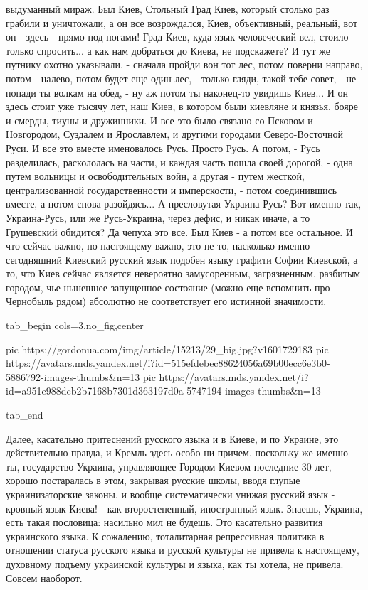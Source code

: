 выдуманный мираж. Был Киев, Стольный Град Киев, который столько раз грабили и
уничтожали, а он все возрождался, Киев, объективный, реальный, вот он - здесь -
прямо под ногами! Град Киев, куда язык человеческий вел, стоило только
спросить...  а как нам добраться до Киева, не подскажете? И тут же путнику
охотно указывали, - сначала пройди вон тот лес, потом поверни направо, потом -
налево, потом будет еще один лес, - только гляди, такой тебе совет, - не попади
ты волкам на обед, - ну аж потом ты наконец-то увидишь Киев...  И он здесь
стоит уже тысячу лет, наш Киев, в котором были киевляне и князья, бояре и
смерды, тиуны и дружинники. И все это было связано со Псковом и Новгородом,
Суздалем и Ярославлем, и другими городами Северо-Восточной Руси.  И все это
вместе именовалось Русь. Просто Русь. А потом, - Русь разделилась, раскололась
на части, и каждая часть пошла своей дорогой, - одна путем вольницы и
освободительных войн, а другая - путем жесткой, централизованной
государственности и имперскости, - потом соединившись вместе, а потом снова
разойдясь... А пресловутая Украина-Русь?  Вот именно так, Украина-Русь, или же
Русь-Украина, через дефис, и никак иначе, а то Грушевский обидится?  Да чепуха
это все. Был Киев - а потом все остальное. И что сейчас важно, по-настоящему
важно, это не то, насколько именно сегодняшний Киевский русский язык подобен
языку графити Софии Киевской, а то, что Киев сейчас является невероятно
замусоренным, загрязненным, разбитым городом, чье нынешнее запущенное состояние
(можно еще вспомнить про Чернобыль рядом) абсолютно не соответствует его
истинной значимости.

\ifcmt
  tab_begin cols=3,no_fig,center

     pic https://gordonua.com/img/article/15213/29_big.jpg?v1601729183
		 pic https://avatars.mds.yandex.net/i?id=515efdebec88624056a69b00ecc6e3b0-5886792-images-thumbs&n=13
		 pic https://avatars.mds.yandex.net/i?id=a951e988dcb2b7168b7301d363197d0a-5747194-images-thumbs&n=13

  tab_end
\fi

Далее, касательно притеснений русского языка и в Киеве, и по Украине, это
действительно правда, и Кремль здесь особо ни причем, поскольку же именно ты,
государство Украина, управляющее Городом Киевом последние 30 лет, хорошо
постаралась в этом, закрывая русские школы, вводя глупые украинизаторские
законы, и вообще систематически унижая русский язык - кровный язык Киева! - как
второстепенный, иностранный язык.  Знаешь, Украина, есть такая пословица:
насильно мил не будешь. Это касательно развития украинского языка. К сожалению,
тоталитарная репрессивная политика в отношении статуса русского языка и русской
культуры не привела к настоящему, духовному подъему украинской культуры и
языка, как ты хотела, не привела. Совсем наоборот.

